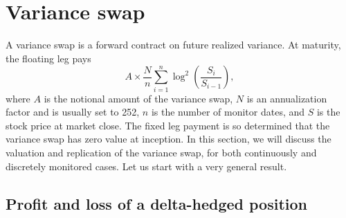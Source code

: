 \documentclass[12pt]{article}
\begin{document}
\section{Variance swap}

  A variance swap is a forward contract on future realized variance. At maturity, the floating leg pays
  \begin{equation}
    A\times\frac{N}{n}\sum_{i=1}^{n}\log^2\left(\frac{S_i}{S_{i-1}}\right),
    \label{VarSwapPayoff}
  \end{equation}
  where $A$ is the notional amount of the variance swap, $N$ is an annualization factor and is usually set to
  252, $n$ is the number of monitor dates, and $S$ is the stock price at market close. The fixed leg payment is
  so determined that the variance swap has zero value at inception. In this section, we will discuss the valuation
  and replication of the variance swap, for both continuously and discretely monitored cases. Let us start with
  a very general result.

  \subsection{Profit and loss of a delta-hedged position}
\end{document}
